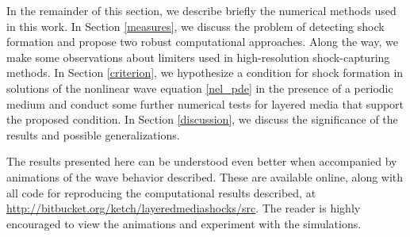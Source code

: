 In the remainder of this section, we describe briefly the numerical
methods used in this work.  In Section \ref{measures},
we discuss the problem of detecting shock formation and propose two
robust computational approaches.  Along the way, we make some 
observations about limiters used in high-resolution shock-capturing methods.  In Section 
\ref{criterion}, we hypothesize
a condition for shock formation in solutions of the nonlinear wave equation
\eqref{nel_pde} in the presence of a periodic medium and
conduct some further numerical tests for layered media that support the
proposed condition.  In Section \ref{discussion}, 
we discuss the significance of the results and possible generalizations.

The results presented here can be understood even better when accompanied
by animations of the wave behavior described.  These are available online,
along with all code for reproducing the computational results described,
at \url{http://bitbucket.org/ketch/layeredmediashocks/src}.
The reader is highly encouraged to view the animations and experiment
with the simulations.




%
%
%
%




